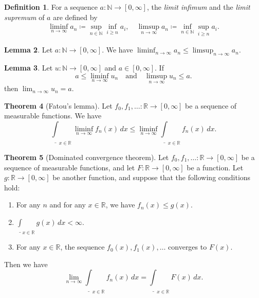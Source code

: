 \documentclass{article}
\theoremstyle{definition}
\newtheorem{theorem}{Theorem}[section]
\newtheorem{lemma}[theorem]{Lemma}
\newtheorem{definition}[theorem]{Definition}
\begin{document}
\begin{definition}
For a sequence $a : \mathbb{N} \to [0, \infty]$,
the \emph{limit infimum} and the
\emph{limit supremum} of $a$ are defined by
\begin{align*}
  \liminf_{n \to \infty} a_n \coloneqq 
  \sup_{n \in \mathbb{N}} \inf_{i \geq n} a_i,\quad
  \limsup_{n \to \infty} a_n \coloneqq
  \inf_{n \in \mathbb{N}} \sup_{i \geq n} a_i.
\end{align*}
\end{definition}

\begin{lemma}
  Let $a : \mathbb{N} \to [0, \infty]$.
  We have $\liminf_{n \to \infty} a_n \leq \limsup_{n \to \infty} a_n$.
\end{lemma}

\begin{lemma}
  Let $u : \mathbb{N} \to [0, \infty]$ and $a \in [0, \infty]$.
  If
  \begin{equation*}
    a \leq \liminf_{n \to \infty} u_n \quad \text{and} \quad
    \limsup_{n \to \infty} u_n \leq a.
  \end{equation*}
  then $\lim_{n \to \infty} u_n = a$.
  \end{lemma}


\begin{theorem}[Fatou's lemma]
  Let $f_0, f_1, \dots : \mathbb{R} \to [0, \infty]$ be
  a sequence of measurable functions.
  We have
  \begin{equation*}
    \underline{\int}_{x \in \mathbb{R}} \liminf_{n \to \infty} f_n (x) \, dx
      \leq \liminf_{n \to \infty} \underline{\int}_{x \in \mathbb{R}} f_n (x) \, dx.
  \end{equation*}
\end{theorem}

\begin{theorem}[Dominated convergence theorem]
  Let $f_0, f_1, \dots : \mathbb{R} \to [0, \infty]$ be
  a sequence of measurable functions,
  and let $F : \mathbb{R} \to [0, \infty]$ be a function.
  Let $g : \mathbb{R} \to [0, \infty]$ be another function, and 
  suppose that the following conditions hold:
  \begin{enumerate}
    \item For any $n$ and for any $x \in \mathbb{R}$,
      we have $f_n (x) \leq g (x)$.
    \item $\underline{\int}_{x \in \mathbb{R}} g (x) \, dx < \infty$.
    \item For any $x \in \mathbb{R}$,
      the sequence $f_0 (x), f_1 (x), \dots$ converges to $F (x)$.
  \end{enumerate}
  Then we have
  \begin{equation*}
    \lim_{n \to \infty} \underline{\int}_{x \in \mathbb{R}} f_n (x) \, dx
      = \underline{\int}_{x \in \mathbb{R}} F (x) \, dx.
  \end{equation*}
\end{theorem}
\end{document}
